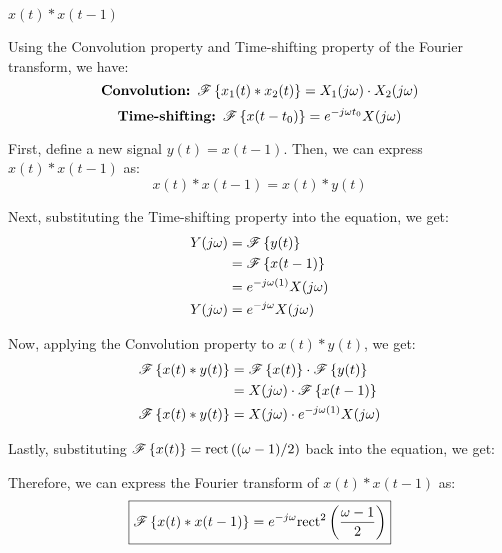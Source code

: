 \documentclass[a4paper, 10pt]{article}
\begin{document}
\newpage

\begin{tosubmit}
\begin{subproblems}[start=5]
    \item \( x(t) * x(t-1) \)
\end{subproblems}

\par\noindent\submitsolution
Using the Convolution property and Time-shifting property of the Fourier transform, we have:
\[
    \textbf{Convolution: } \mathscr{F} \left\{ x_1(t) * x_2(t) \right\} = X_1(j\omega) \cdot X_2(j\omega)
\]
\[
    \textbf{Time-shifting: } \mathscr{F} \left\{ x(t - t_0) \right\} = e^{-j\omega t_0} X(j\omega)
\]

First, define a new signal \( y(t) = x(t - 1) \). Then, we can express \( x(t) * x(t - 1) \) as:
\[
    x(t) * x(t - 1) = x(t) * y(t)
\]

Next, substituting the Time-shifting property into the equation, we get:
\begin{align*}  
    Y(j\omega) &= \mathscr{F} \left\{ y(t) \right\} \\
    &= \mathscr{F} \left\{ x(t - 1) \right\} \\
    &= e^{-j\omega (1)} X(j\omega) \\
    Y(j\omega) &= e^{-j\omega} X(j\omega)
\end{align*}

Now, applying the Convolution property to \( x(t) * y(t) \), we get:
\begin{align*}  
    \mathscr{F} \left\{ x(t) * y(t) \right\} &= \mathscr{F} \left\{ x(t) \right\} \cdot \mathscr{F} \left\{ y(t) \right\} \\
    &= X(j\omega) \cdot \mathscr{F} \left\{ x(t - 1) \right\} \\
    \mathscr{F} \left\{ x(t) * y(t) \right\} &= X(j\omega) \cdot e^{-j\omega (1)} X(j\omega)
\end{align*}

Lastly, substituting \( \mathscr{F} \left\{ x(t) \right\} = \textrm{rect} \left( (\omega-1)/2 \right) \) back into the equation, we get:

Therefore, we can express the Fourier transform of \( x(t) * x(t - 1) \) as:
\[ \boxed{
    \mathscr{F} \left\{ x(t) * x(t - 1) \right\} = e^{-j\omega} \textrm{rect}^2 \left( \frac{\omega - 1}{2} \right)
} \]
\end{tosubmit}

\newpage

\begin{problem}
\end{problem}
\end{document}
